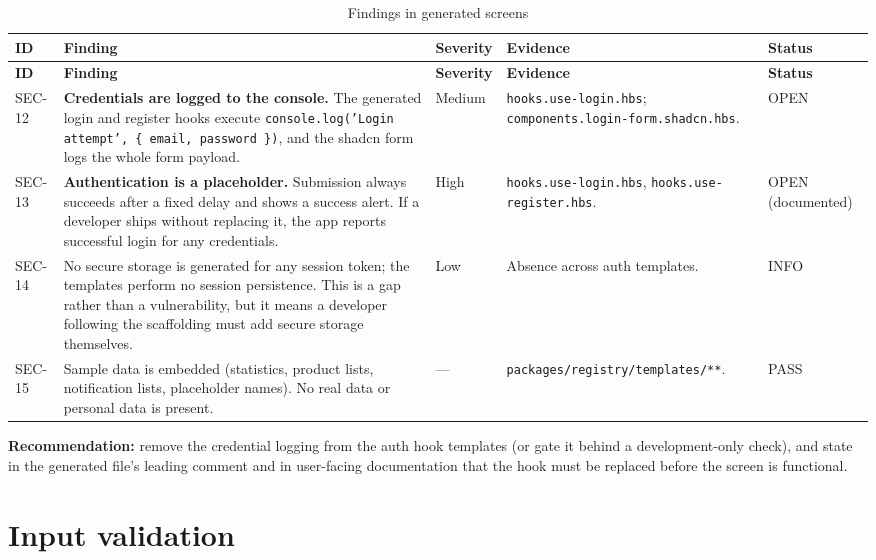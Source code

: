 \begin{longtable}{@{}L{1.3cm}L{3.6cm}L{1.9cm}L{5.8cm}L{1.6cm}@{}}
\caption{Findings in generated screens}\\
\toprule
\textbf{ID} & \textbf{Finding} & \textbf{Severity} & \textbf{Evidence} & \textbf{Status} \\
\midrule
\endfirsthead
\toprule
\textbf{ID} & \textbf{Finding} & \textbf{Severity} & \textbf{Evidence} & \textbf{Status} \\
\midrule
\endhead
SEC-12 & \textbf{Credentials are logged to the console.} The generated login and
register hooks execute \texttt{console.log('Login attempt', \{ email, password
\})}, and the shadcn form logs the whole form payload. & Medium &
\texttt{hooks.use-login.hbs}; \texttt{components.login-form.shadcn.hbs}. & OPEN \\
SEC-13 & \textbf{Authentication is a placeholder.} Submission always succeeds after
a fixed delay and shows a success alert. If a developer ships without replacing it,
the app reports successful login for any credentials. & High &
\texttt{hooks.use-login.hbs}, \texttt{hooks.use-register.hbs}. & OPEN (documented) \\
SEC-14 & No secure storage is generated for any session token; the templates
perform no session persistence. This is a gap rather than a vulnerability, but it
means a developer following the scaffolding must add secure storage themselves. &
Low & Absence across auth templates. & INFO \\
SEC-15 & Sample data is embedded (statistics, product lists, notification lists,
placeholder names). No real data or personal data is present. & --- &
\texttt{packages/registry/templates/**}. & PASS \\
\bottomrule
\end{longtable}

\textbf{Recommendation:} remove the credential logging from the auth hook templates
(or gate it behind a development-only check), and state in the generated file's
leading comment and in user-facing documentation that the hook must be replaced
before the screen is functional.

\section{Input validation}

